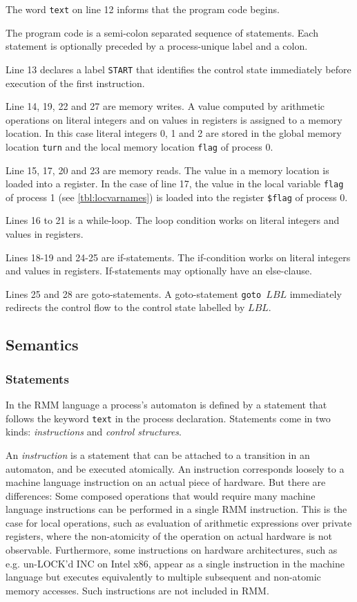 \documentclass[a4paper]{article}
\begin{document}
The word \verb+text+ on line 12 informs that the program code begins. 

The program code is a semi-colon separated sequence of
statements. Each statement is optionally preceded by a process-unique
label and a colon.

Line 13 declares a label \verb+START+ that identifies the control
state immediately before execution of the first instruction.

Line 14, 19, 22 and 27 are memory writes. A value computed by
arithmetic operations on literal integers and on values in registers
is assigned to a memory location. In this case literal integers 0, 1
and 2 are stored in the global memory location \verb+turn+ and the
local memory location \verb+flag+ of process 0.

Line 15, 17, 20 and 23 are memory reads. The value in a memory
location is loaded into a register. In the case of line 17, the value
in the local variable \verb+flag+ of process 1 (see
\cref{tbl:locvarnames}) is loaded into the register \verb+$flag+ of
process 0.

Lines 16 to 21 is a while-loop. The loop condition works on literal
integers and values in registers. 

Lines 18-19 and 24-25 are if-statements. The if-condition works on
literal integers and values in registers. If-statements may optionally
have an else-clause.

Lines 25 and 28 are goto-statements. A goto-statement \verb+goto +$LBL$
immediately redirects the control flow to the control state labelled
by $LBL$.

\subsection{Semantics}\label{sec:semantics}
\subsubsection{Statements}

In the RMM language a process's automaton is defined by a statement
that follows the keyword \verb+text+ in the process
declaration. Statements come in two kinds: \emph{instructions} and
\emph{control structures}. 

An \emph{instruction} is a statement that can be attached to a
transition in an automaton, and be executed atomically. An instruction
corresponds loosely to a machine language instruction on an actual
piece of hardware. But there are differences: Some composed operations
that would require many machine language instructions can be performed
in a single RMM instruction. This is the case for local operations,
such as evaluation of arithmetic expressions over private registers,
where the non-atomicity of the operation on actual hardware is not
observable. Furthermore, some instructions on hardware architectures,
such as e.g. un-LOCK'd INC on Intel x86, appear as a single
instruction in the machine language but executes equivalently to
multiple subsequent and non-atomic memory accesses. Such instructions
are not included in RMM.
\end{document}
